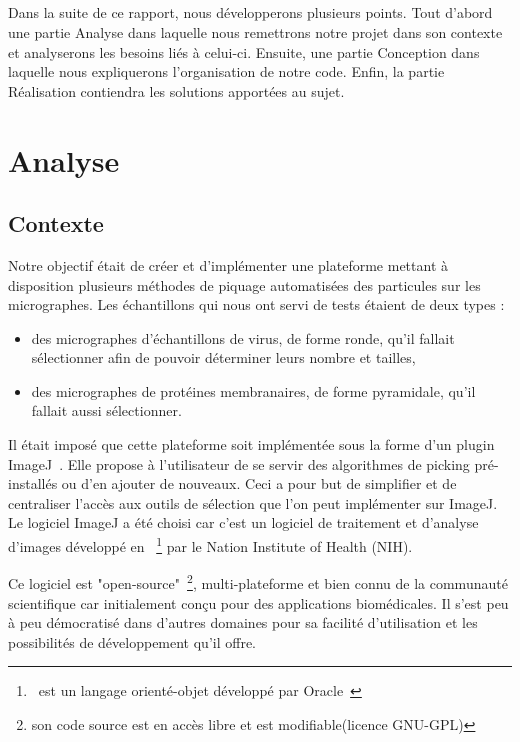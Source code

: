 \documentclass[11pt,a4paper]{report}
\begin{document}
\paragraph*{}
Dans la suite de ce rapport, nous développerons plusieurs points. Tout d'abord une partie Analyse dans laquelle nous remettrons notre projet dans son contexte et analyserons les besoins liés à celui-ci. Ensuite, une partie Conception dans laquelle nous expliquerons l'organisation de notre code. Enfin, la partie Réalisation contiendra les solutions apportées au sujet.

\chapter{Analyse}

\section{Contexte}
\noindent
Notre objectif était de créer et d'implémenter une plateforme mettant à disposition plusieurs méthodes de piquage automatisées des particules sur les micrographes. Les échantillons qui nous ont servi de tests étaient de deux types :%
\begin{itemize}
\item des micrographes d'échantillons de virus, de forme ronde, qu'il fallait sélectionner afin de pouvoir déterminer leurs nombre et tailles,
\item des micrographes de protéines membranaires, de forme pyramidale, qu'il fallait aussi sélectionner.\\
\end{itemize}
\noindent
Il était imposé que cette plateforme soit implémentée sous la forme d'un plugin ImageJ~\cite{imagej:url}. Elle propose à l'utilisateur de se servir des algorithmes de picking pré-installés ou d'en ajouter de nouveaux. Ceci a pour but de simplifier et de centraliser l'accès aux outils de sélection que l'on peut implémenter sur ImageJ.\\%

\noindent
Le logiciel ImageJ a été choisi car c'est un logiciel de traitement et d'analyse d'images développé en \java~\footnote{\java\ est un langage orienté-objet développé par Oracle~\cite{java:url}} par le Nation Institute of Health (NIH).%

\noindent
Ce logiciel est "open-source"~\footnote{son code source est en accès libre et est modifiable(licence GNU-GPL)}, multi-plateforme et bien connu de la communauté scientifique car initialement conçu pour des applications biomédicales. Il s'est peu à peu démocratisé dans d'autres domaines pour sa facilité d'utilisation et les possibilités de développement qu'il offre.%
\end{document}
